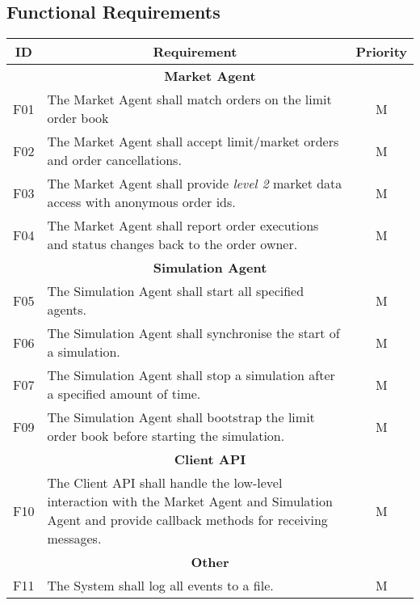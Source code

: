 \subsection{Functional Requirements}
\begin{center}
\begin{longtable}[htbp]{c p{4.2in} c }

\multicolumn{1}{c}{\textbf{ID}}           &
\multicolumn{1}{c}{\textbf{Requirement}}  &
\multicolumn{1}{c}{\textbf{Priority}}     \\              
\toprule

\multicolumn{3}{c}{\textbf{Market Agent}}   	         \\
F01  & The Market Agent shall match orders on the limit order book & M \\ 
F02  & The Market Agent shall accept limit/market orders and order cancellations. & M \\
F03  & The Market Agent shall provide \textit{level 2} market data access with anonymous order ids. & M \\
F04  & The Market Agent shall report order executions and status changes back to the order owner. & M \\ 

\multicolumn{3}{c}{\textbf{Simulation Agent}}   \\
F05  & The Simulation Agent shall start all specified agents.  & M \\
F06  & The Simulation Agent shall synchronise the start of a simulation. & M \\
F07  & The Simulation Agent shall stop a simulation after a specified amount of time. & M \\
F09  & The Simulation Agent shall bootstrap the limit order book before starting the simulation. & M \\ 

\multicolumn{3}{c}{\textbf{Client API}}   \\
F10  & The Client API shall handle the low-level interaction with the Market Agent and Simulation Agent and provide callback methods for receiving messages. & M \\

\multicolumn{3}{c}{\textbf{Other}}   		             \\
F11  & The System shall log all events to a file.        & M \\
         
\end{longtable}
\end{center}

